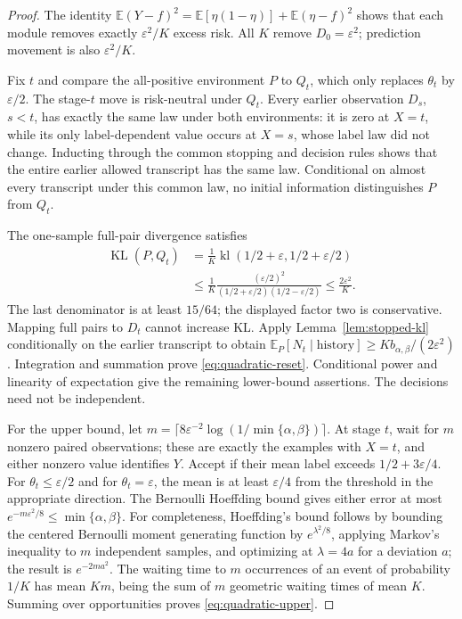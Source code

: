 \begin{proof}
The identity
$\mathbb E(Y-f)^2=\mathbb E[\eta(1-\eta)]+\mathbb E(\eta-f)^2$
shows that each module removes exactly $\varepsilon^2/K$ excess risk.
All $K$ remove $D_0=\varepsilon^2$; prediction movement is also
$\varepsilon^2/K$.

Fix $t$ and compare the all-positive environment $P$ to $Q_t$, which only
replaces $\theta_t$ by $\varepsilon/2$. The stage-$t$ move is risk-neutral
under $Q_t$. Every earlier observation $D_s$, $s<t$, has exactly the same
law under both environments: it is zero at $X=t$, while its only
label-dependent value occurs at $X=s$, whose label law did not change.
Inducting through the common stopping and decision rules shows that the
entire earlier allowed transcript has the same law. Conditional on almost
every transcript under this common law, no initial information
distinguishes $P$ from $Q_t$.

The one-sample full-pair divergence satisfies
\begin{align*}
 \operatorname{KL}(P,Q_t)
 &=\frac1K\operatorname{kl}(1/2+\varepsilon,1/2+\varepsilon/2)\\
 &\le\frac1K\frac{(\varepsilon/2)^2}
                    {(1/2+\varepsilon/2)(1/2-\varepsilon/2)}
 \le\frac{2\varepsilon^2}{K}.
\end{align*}
The last denominator is at least $15/64$; the displayed factor two is
conservative. Mapping full pairs to $D_t$ cannot increase KL.
Apply Lemma~\ref{lem:stopped-kl} conditionally on the earlier transcript
to obtain $\mathbb E_P[N_t\mid\text{history}]
\ge Kb_{\alpha,\beta}/(2\varepsilon^2)$.
Integration and summation prove \eqref{eq:quadratic-reset}.
Conditional power and linearity of expectation give the remaining
lower-bound assertions. The decisions need not be independent.

For the upper bound, let
$m=\lceil8\varepsilon^{-2}\log(1/\min\{\alpha,\beta\})\rceil$.
At stage $t$, wait for $m$ nonzero paired observations; these are exactly
the examples with $X=t$, and either nonzero value identifies $Y$.
Accept if their mean label exceeds $1/2+3\varepsilon/4$.
For $\theta_t\le\varepsilon/2$ and for $\theta_t=\varepsilon$, the mean
is at least $\varepsilon/4$ from the threshold in the appropriate
direction. The Bernoulli Hoeffding bound gives either error at most
$e^{-m\varepsilon^2/8}\le\min\{\alpha,\beta\}$.
For completeness, Hoeffding's bound follows by bounding the centered
Bernoulli moment generating function by $e^{\lambda^2/8}$,
applying Markov's inequality to $m$ independent samples, and optimizing
at $\lambda=4a$ for a deviation $a$; the result is $e^{-2ma^2}$.
The waiting time to $m$ occurrences of an event of probability $1/K$ has
mean $Km$, being the sum of $m$ geometric waiting times of mean $K$.
Summing over opportunities proves \eqref{eq:quadratic-upper}.
\end{proof}

